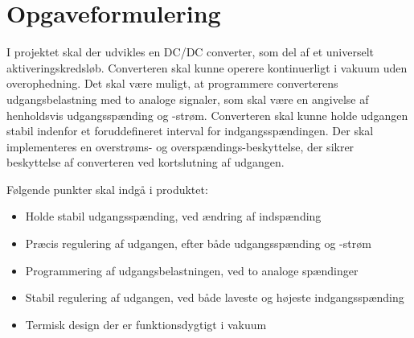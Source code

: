 

\section{Opgaveformulering}
I projektet skal der udvikles en DC/DC converter, som del af et universelt aktiveringskredsløb. Converteren skal kunne operere kontinuerligt i vakuum uden overophedning. Det skal være muligt, at programmere converterens udgangsbelastning med to analoge signaler, som skal være en angivelse af henholdsvis udgangsspænding og -strøm. Converteren skal kunne holde udgangen stabil indenfor et foruddefineret interval for indgangsspændingen. Der skal implementeres en overstrøms- og overspændings-beskyttelse, der sikrer beskyttelse af converteren ved kortslutning af udgangen. 

\noindent Følgende punkter skal indgå i produktet:
\begin{itemize}
	\item Holde stabil udgangsspænding, ved ændring af indspænding
	\item Præcis regulering af udgangen, efter både udgangsspænding og -strøm
	\item Programmering af udgangsbelastningen, ved to analoge spændinger
	\item Stabil regulering af udgangen, ved både laveste og højeste indgangsspænding
	\item Termisk design der er funktionsdygtigt i vakuum 
\end{itemize}
